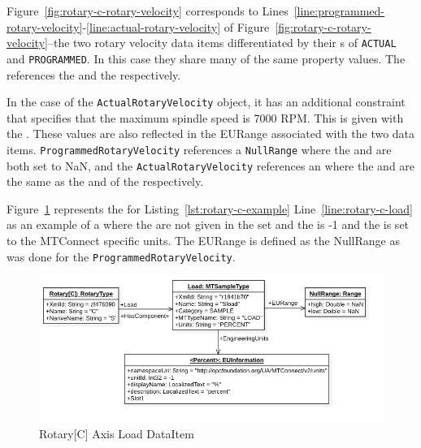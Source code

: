 Figure~\ref{fig:rotary-c-rotary-velocity} corresponds to Lines~\ref{line:programmed-rotary-velocity}-\ref{line:actual-rotary-velocity} of Figure~\ref{fig:rotary-c-rotary-velocity}--the two rotary velocity data items differentiated by their s of \texttt{ACTUAL} and \texttt{PROGRAMMED}. In this case they share many of the same property values. The  references the  and the  respectively.

In the case of the \texttt{ActualRotaryVelocity} object, it has an additional constraint that specifies that the maximum spindle speed is 7000 RPM. This is given with the . These values are also reflected in the EURange associated with the two data items. \texttt{ProgrammedRotaryVelocity} references a \texttt{NullRange} where the  and  are both set to NaN, and the \texttt{ActualRotaryVelocity} references an  where the  and  are the same as the  and  of the  respectively. 

\FloatBarrier

Figure~\ref{fig:rotary-c-load} represents the   for Listing~\ref{lst:rotary-c-example} Line~\ref{line:rotary-c-load} as an example of a  where the  are not given in the  set and the  is -1 and the  is set to the MTConnect specific units. The EURange is defined as the NullRange as was done for the \texttt{ProgrammedRotaryVelocity}.

\begin{figure}[ht]
    \centering
    \includegraphics[width=1.0\textwidth]{diagrams/mtconnect-mapping/rotary-c-load.png}
    \caption{Rotary[C] Axis Load DataItem}
    \label{fig:rotary-c-load}
\end{figure}

